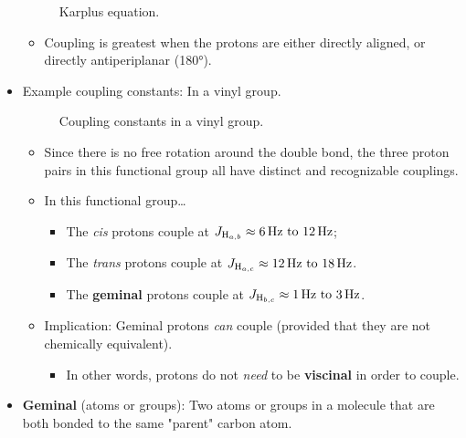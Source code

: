 \documentclass[../notes.tex]{subfiles}
\begin{document}
\begin{itemize}
\begin{figure}[h!]
        \caption{Karplus equation.}
        \label{fig:karplusEqn}
    \end{figure}
    \begin{itemize}
        \item Coupling is greatest when the protons are either directly aligned, or directly antiperiplanar (\ang{180}).
    \end{itemize}
    \item Example coupling constants: In a vinyl group.
    \begin{figure}[h!]
        \centering
        \footnotesize
        \caption{Coupling constants in a vinyl group.}
        \label{fig:couplingVinyl}
    \end{figure}
    \begin{itemize}
        \item Since there is no free rotation around the double bond, the three proton pairs in this functional group all have distinct and recognizable couplings.
        \item In this functional group\dots
        \begin{itemize}
            \item The \emph{cis} protons couple at $J_{\ce{H_{a,b}}}\approx\SIrange{6}{12}{\hertz}$;
            \item The \emph{trans} protons couple at $J_{\ce{H_{a,c}}}\approx\SIrange{12}{18}{\hertz}$.
            \item The \textbf{geminal} protons couple at $J_{\ce{H_{b,c}}}\approx\SIrange{1}{3}{\hertz}$.
        \end{itemize}
        \item Implication: Geminal protons \emph{can} couple (provided that they are not chemically equivalent).
        \begin{itemize}
            \item In other words, protons do not \emph{need} to be \textbf{viscinal} in order to couple.
        \end{itemize}
    \end{itemize}
    \pagebreak
    \item \textbf{Geminal} (atoms or groups): Two atoms or groups in a molecule that are both bonded to the same "parent" carbon atom.

\end{itemize}
\end{document}
